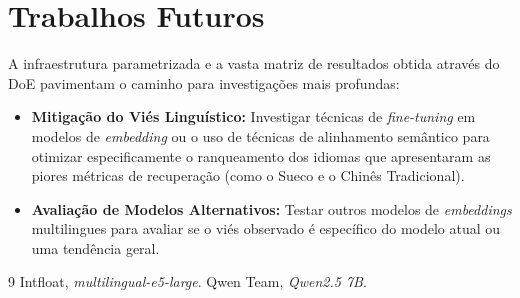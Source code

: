 \documentclass[manuscript,screen]{acmart}
\begin{document}
\section{Trabalhos Futuros}
A infraestrutura parametrizada e a vasta matriz de resultados obtida através do DoE pavimentam o caminho para investigações mais profundas:
\begin{itemize}
    \item \textbf{Mitigação do Viés Linguístico:} Investigar técnicas de \textit{fine-tuning} em modelos de \textit{embedding} ou o uso de técnicas de alinhamento semântico para otimizar especificamente o ranqueamento dos idiomas que apresentaram as piores métricas de recuperação (como o Sueco e o Chinês Tradicional).
    \item \textbf{Avaliação de Modelos Alternativos:} Testar outros modelos de \textit{embeddings} multilingues para avaliar se o viés observado é específico do modelo atual ou uma tendência geral.
\end{itemize}

\begin{thebibliography}{9}
 Intfloat, \emph{multilingual-e5-large}.
 Qwen Team, \emph{Qwen2.5 7B}.
\end{thebibliography}
\end{document}

